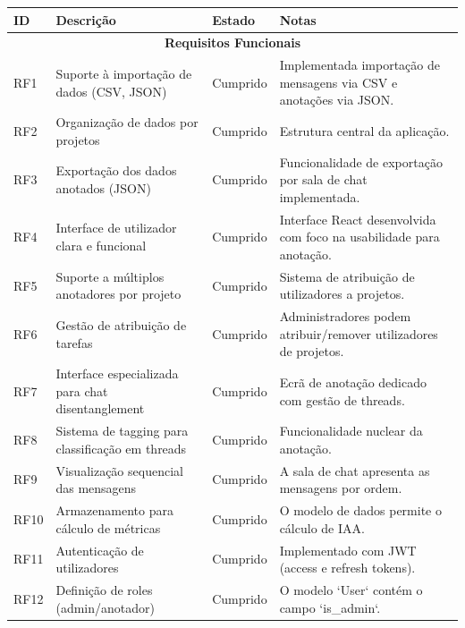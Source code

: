 \begin{table}[h!]
    \centering
    \begin{tabular}{|p{}|p{}|p{}|p{}|}
        \hline
        \textbf{ID} & \textbf{Descrição} & \textbf{Estado} & \textbf{Notas} \\
        \hline
        \multicolumn{4}{|c|}{\textbf{Requisitos Funcionais}} \\
        \hline
        RF1 & Suporte à importação de dados (CSV, JSON) & Cumprido & Implementada importação de mensagens via CSV e anotações via JSON. \\
        \hline
        RF2 & Organização de dados por projetos & Cumprido & Estrutura central da aplicação. \\
        \hline
        RF3 & Exportação dos dados anotados (JSON) & Cumprido & Funcionalidade de exportação por sala de chat implementada. \\
        \hline
        RF4 & Interface de utilizador clara e funcional & Cumprido & Interface React desenvolvida com foco na usabilidade para anotação. \\
        \hline
        RF5 & Suporte a múltiplos anotadores por projeto & Cumprido & Sistema de atribuição de utilizadores a projetos. \\
        \hline
        RF6 & Gestão de atribuição de tarefas & Cumprido & Administradores podem atribuir/remover utilizadores de projetos. \\
        \hline
        RF7 & Interface especializada para chat disentanglement & Cumprido & Ecrã de anotação dedicado com gestão de threads. \\
        \hline
        RF8 & Sistema de tagging para classificação em threads & Cumprido & Funcionalidade nuclear da anotação. \\
        \hline
        RF9 & Visualização sequencial das mensagens & Cumprido & A sala de chat apresenta as mensagens por ordem. \\
        \hline
        RF10 & Armazenamento para cálculo de métricas & Cumprido & O modelo de dados permite o cálculo de IAA. \\
        \hline
        RF11 & Autenticação de utilizadores & Cumprido & Implementado com JWT (access e refresh tokens). \\
        \hline
        RF12 & Definição de roles (admin/anotador) & Cumprido & O modelo `User` contém o campo `is\_admin`. \\
        \hline

\end{tabular}
\end{table}
